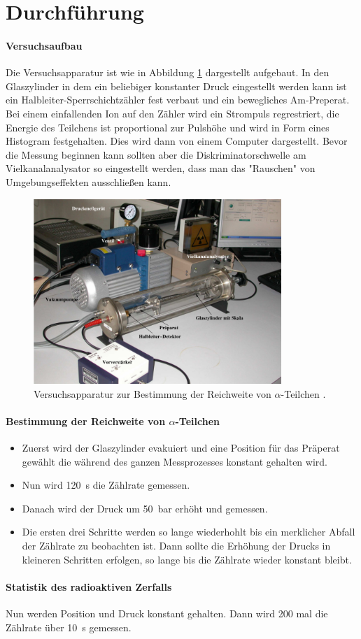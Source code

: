 \section{Durchführung}
\label{sec:Durchführung}
\paragraph{Versuchsaufbau}
Die Versuchsapparatur ist wie in Abbildung \ref{fig:VB} dargestellt aufgebaut.
In den Glaszylinder in dem ein beliebiger konstanter Druck eingestellt werden kann
ist ein Halbleiter-Sperrschichtzähler fest verbaut und ein bewegliches Am-Preperat.
Bei einem einfallenden Ion auf den Zähler wird ein Strompuls regrestriert,
die Energie des Teilchens ist proportional zur Pulshöhe und wird in Form eines
Histogram festgehalten. Dies wird dann von einem Computer dargestellt. Bevor
die Messung beginnen kann sollten aber die Diskriminatorschwelle am Vielkanalanalysator
so eingestellt werden, dass man das "Rauschen" von Umgebungseffekten ausschließen kann.

\begin{figure}
  \centering
  \includegraphics[height=7cm]{logos/Versuchsaufbau.png}
  \caption{Versuchsapparatur zur Bestimmung der Reichweite von \texorpdfstring{$\alpha$}{math}-Teilchen \cite{Anleitung}.}
  \label{fig:VB}
\end{figure}
\paragraph{Bestimmung der Reichweite von \texorpdfstring{$\alpha$}{math}-Teilchen}
\begin{itemize}
  \item Zuerst wird der Glaszylinder evakuiert und eine Position für das Präperat gewählt
  die während des ganzen Messprozesses konstant gehalten wird.
  \item Nun wird \SI{120}{\second} die Zählrate gemessen.
  \item Danach wird der Druck um \SI{50}{\bar} erhöht und gemessen.
  \item Die ersten drei Schritte werden so lange wiederhohlt bis ein merklicher
  Abfall der Zählrate zu beobachten ist. Dann sollte die Erhöhung der Drucks in
  kleineren Schritten erfolgen, so lange bis die Zählrate wieder konstant bleibt.
\end{itemize}
\paragraph{Statistik des radioaktiven Zerfalls}
Nun werden Position und Druck konstant gehalten. Dann wird 200 mal die
Zählrate über \SI{10}{\second} gemessen.
